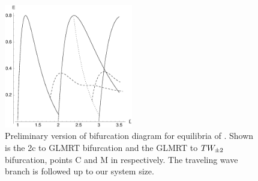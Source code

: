 \begin{figure}[t]
\centering
\includegraphics[width=0.5\textwidth]{figs/ksBifDiag.eps}
\caption{
    {\small
    Preliminary version of bifurcation diagram for equilibria of \KSe.  Shown is the 2c to GLMRT bifurcation and the GLMRT to $TW_{\pm2}$ bifurcation, points C and M in  respectively. The traveling wave branch is followed up to our system size.} %
        }
\label{fig:ksBifDiag}
\end{figure}

